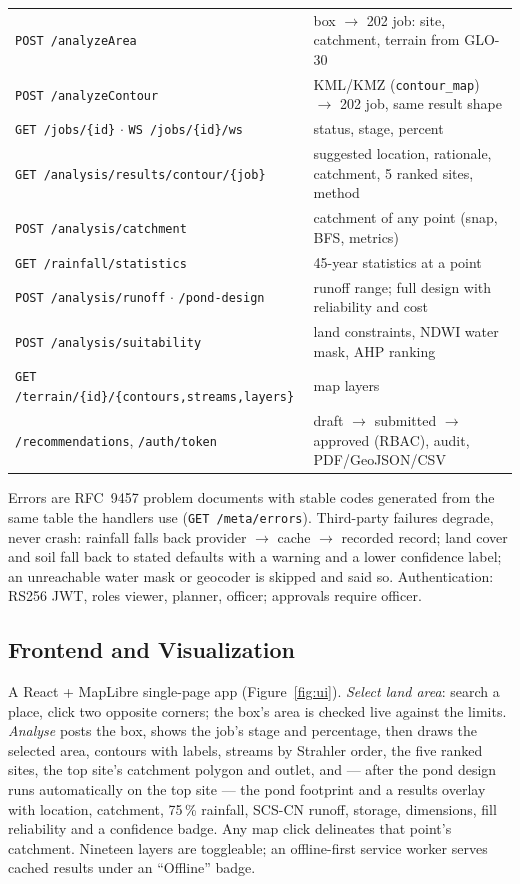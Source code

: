 \documentclass[manuscript,screen,review]{acmart}
\begin{document}
\begin{center}\small
\begin{tabularx}{\linewidth}{@{}lL@{}}
\toprule
\texttt{POST /analyzeArea} & box $\rightarrow$ 202 job: site, catchment, terrain from GLO-30 \\
\texttt{POST /analyzeContour} & KML/KMZ (\texttt{contour\_map}) $\rightarrow$ 202 job, same result shape \\
\texttt{GET /jobs/\{id\}} $\cdot$ \texttt{WS /jobs/\{id\}/ws} & status, stage, percent \\
\texttt{GET /analysis/results/contour/\{job\}} & suggested location, rationale, catchment, 5 ranked sites, method \\
\texttt{POST /analysis/catchment} & catchment of any point (snap, BFS, metrics) \\
\texttt{GET /rainfall/statistics} & 45-year statistics at a point \\
\texttt{POST /analysis/runoff} $\cdot$ \texttt{/pond-design} & runoff range; full design with reliability and cost \\
\texttt{POST /analysis/suitability} & land constraints, NDWI water mask, AHP ranking \\
\texttt{GET /terrain/\{id\}/\{contours,streams,layers\}} & map layers \\
\texttt{/recommendations}, \texttt{/auth/token} & draft $\rightarrow$ submitted $\rightarrow$ approved (RBAC), audit, PDF/GeoJSON/CSV \\
\bottomrule
\end{tabularx}
\end{center}

Errors are RFC~9457 problem documents with stable codes generated from the same table the
handlers use (\texttt{GET /meta/errors}). Third-party failures degrade, never crash: rainfall
falls back provider $\rightarrow$ cache $\rightarrow$ recorded record; land cover and soil
fall back to stated defaults with a warning and a lower confidence label; an unreachable
water mask or geocoder is skipped and said so. Authentication: RS256 JWT, roles viewer,
planner, officer; approvals require officer.

\subsection{Frontend and Visualization}
A React + MapLibre single-page app (Figure~\ref{fig:ui}). \emph{Select land area}: search a
place, click two opposite corners; the box's area is checked live against the limits.
\emph{Analyse} posts the box, shows the job's stage and percentage, then draws the selected
area, contours with labels, streams by Strahler order, the five ranked sites, the top site's
catchment polygon and outlet, and --- after the pond design runs automatically on the top site
--- the pond footprint and a results overlay with location, catchment, 75\,\% rainfall, SCS-CN
runoff, storage, dimensions, fill reliability and a confidence badge. Any map click delineates
that point's catchment. Nineteen layers are toggleable; an offline-first service worker serves
cached results under an ``Offline'' badge.
\end{document}
